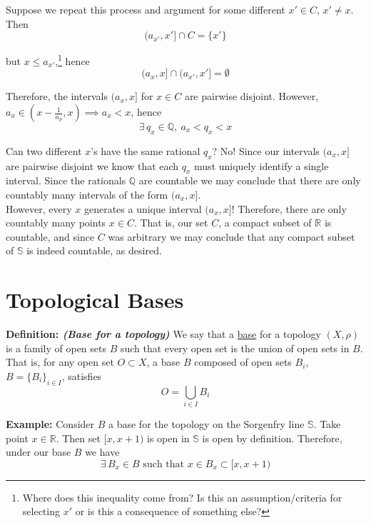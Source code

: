 \documentclass[12pt]{article}
\newlength\tindent
\renewcommand{\indent}{\hspace*{\tindent}}
\newcommand{\R}{\mathbb R}
\newcommand{\Q}{\mathbb Q}
\begin{document}
Suppose we repeat this process and argument for some different $x' \in C$, $x' \neq x$. Then
\begin{equation*}
	(a_{x'}, x'] \cap C = \{x'\}
\end{equation*}

but $x \leq a_{x'}$,\footnote{Where does this inequality come from? Is this an assumption/criteria for selecting $x'$ or is this a consequence of something else?} hence
\begin{equation*}
	(a_x, x] \cap (a_{x'}, x'] = \emptyset
\end{equation*}

Therefore, the intervals $(a_x, x]$ for $x \in C$ are pairwise disjoint. However, $a_x \in \left(x - \frac{1}{n_p}, x\right) \implies a_x < x$, hence
\begin{equation*}
	\exists\,q_x \in \Q, ~ a_x < q_x < x
\end{equation*}

\indent Can two different $x$'s have the same rational $q_x$? No! Since our intervals $(a_x, x]$ are pairwise disjoint we know that each $q_x$ must uniquely identify a single interval. Since the rationals $\Q$ are countable we may conclude that there are only countably many intervals of the form $(a_x, x]$. \\

\indent However, every $x$ generates a unique interval $(a_x, x]$! Therefore, there are only countably many points $x \in C$. That is, our set $C$, a compact subset of $\R$ is countable, and since $C$ was arbitrary we may conclude that any compact subset of $\mathbb S$ is indeed countable, as desired. 

\section{Topological Bases}

%
%
{\bf Definition: {\em (Base for a topology)}} We say that a \underline{base} for a topology $(X, \rho)$ is a family of open sets $B$ such that every open set is the union of open sets in $B$. That is, for any open set $O \subset X$, a base $B$ composed of open sets $B_i$, $B = \{B_i\}_{i\in I}$, satisfies 
\begin{equation*}
	O = \bigcup_{i \in I} B_i
\end{equation*}

%
%
{\bf Example:} Consider $B$ a base for the topology on the Sorgenfry line $\mathbb S$. Take point $x \in \R$. Then set $[x, x + 1)$ is open in $\mathbb S$ is open by definition. Therefore, under our base $B$ we have
\begin{equation*}
	\exists\, B_x \in B \text{ such that } x \in B_x \subset [x, x + 1)
\end{equation*}
\end{document}
